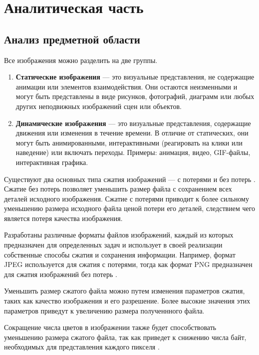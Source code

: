 \chapter{Аналитическая часть}

\section{Анализ предметной области}

Все изображения можно разделить на две группы.
\begin{enumerate}
    \item \textbf{Статические изображения} --- это визуальные представления, не содержащие анимации или элементов взаимодействия. Они остаются неизменными и могут быть представлены в виде рисунков, фотографий, диаграмм или любых других неподвижных изображений сцен или объектов.
    \item \textbf{Динамические изображения} --- это визуальные представления, содержащие движения или изменения в течение времени. В отличие от статических, они могут быть анимированными, интерактивными (реагировать на клики или наведение) или включать переходы. Примеры: анимация, видео, GIF-файлы, интерактивная графика.
\end{enumerate}

Существуют два основных типа сжатия изображений --- с потерями и без потерь \cite{article-1}. Сжатие без потерь позволяет уменьшить размер файла с сохранением всех деталей исходного изображения. Сжатие с потерями приводит к более сильному уменьшению размера исходного файла ценой потери его деталей, следствием чего является потеря качества изображения.

Разработаны различные форматы файлов изображений, каждый из которых предназначен для определенных задач и использует в своей реализации собственные способы сжатия и сохранения информации. Например, формат JPEG используется для сжатия с потерями, тогда как формат PNG предназначен для сжатия изображений без потерь \cite{article-2}.

Уменьшить размер сжатого файла можно путем изменения параметров сжатия, таких как качество изображения и его разрешение. Более высокие значения этих параметров приведут к увеличению размера полученнного файла.

Сокращение числа цветов в изображении также будет способствовать уменьшению размера сжатого файла, так как приведет к снижению числа байт, необходимых для представления каждого пикселя \cite{ImageCompression}.


